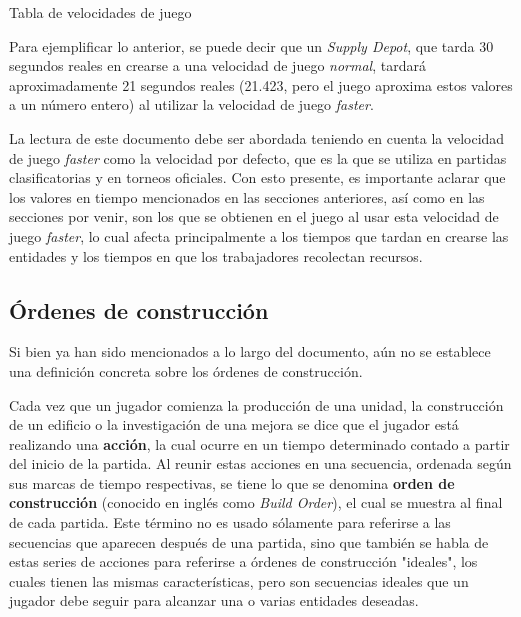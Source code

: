 \begin{table}[H]
\centering
\def\arraystretch{1.8}
\captionsetup{justification=centering}
\caption{Tabla de velocidades de juego}
\label{tab:1}
\caption*{\textbf{Fuente}: Elaboración Propia, 2021}
\end{table}

Para ejemplificar lo anterior, se puede decir que un \textit{Supply Depot}, que tarda 30 segundos reales en crearse a una velocidad de juego \textit{normal}, tardará aproximadamente 21 segundos reales (21.423, pero el juego aproxima estos valores a un número entero) al utilizar la velocidad de juego \textit{faster}.

La lectura de este documento debe ser abordada teniendo en cuenta la velocidad de juego \textit{faster} como la velocidad por defecto, que es la que se utiliza en partidas clasificatorias y en torneos oficiales. Con esto presente, es importante aclarar que los valores en tiempo mencionados en las secciones anteriores, así como en las secciones por venir, son los que se obtienen en el juego al usar esta velocidad de juego \textit{faster}, lo cual afecta principalmente a los tiempos que tardan en crearse las entidades y los tiempos en que los trabajadores recolectan recursos.

\subsection{Órdenes de construcción}

Si bien ya han sido mencionados a lo largo del documento, aún no se establece una definición concreta sobre los órdenes de construcción.

Cada vez que un jugador comienza la producción de una unidad, la construcción de un edificio o la investigación de una mejora se dice que el jugador está realizando una \textbf{acción}, la cual ocurre en un tiempo determinado contado a partir del inicio de la partida. Al reunir estas acciones en una secuencia, ordenada según sus marcas de tiempo respectivas, se tiene lo que se denomina \textbf{orden de construcción} (conocido en inglés como \textit{Build Order}), el cual se muestra al final de cada partida. Este término no es usado sólamente para referirse a las secuencias que aparecen después de una partida, sino que también se habla de estas series de acciones para referirse a órdenes de construcción "ideales", los cuales tienen las mismas características, pero son secuencias ideales que un jugador debe seguir para alcanzar una o varias entidades deseadas.


